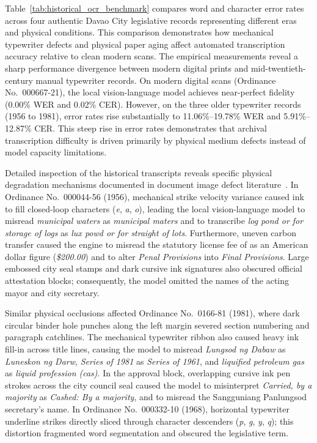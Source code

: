 Table~\ref{tab:historical_ocr_benchmark} compares word and character error rates across four authentic Davao City legislative records representing different eras and physical conditions. This comparison demonstrates how mechanical typewriter defects and physical paper aging affect automated transcription accuracy relative to clean modern scans. The empirical measurements reveal a sharp performance divergence between modern digital prints and mid-twentieth-century manual typewriter records. On modern digital scans (Ordinance No.~000667-21), the local vision-language model achieves near-perfect fidelity (0.00\% WER and 0.02\% CER). However, on the three older typewriter records (1956 to 1981), error rates rise substantially to 11.06\%--19.78\% WER and 5.91\%--12.87\% CER. This steep rise in error rates demonstrates that archival transcription difficulty is driven primarily by physical medium defects instead of model capacity limitations.

Detailed inspection of the historical transcripts reveals specific physical degradation mechanisms documented in document image defect literature~\cite{baird1993defect,lopresti2008optical}. In Ordinance No.~000044-56 (1956), mechanical strike velocity variance caused ink to fill closed-loop characters (\textit{e}, \textit{a}, \textit{o}), leading the local vision-language model to misread \textit{municipal waters} as \textit{municipal maters} and to transcribe \textit{log pond or for storage of logs} as \textit{lux powd or for straight of lots}. Furthermore, uneven carbon transfer caused the engine to misread the statutory license fee of \textit{} as an American dollar figure (\textit{\$200.00}) and to alter \textit{Penal Provisions} into \textit{Final Provisions}. Large embossed city seal stamps and dark cursive ink signatures also obscured official attestation blocks; consequently, the model omitted the names of the acting mayor and city secretary.

Similar physical occlusions affected Ordinance No.~0166-81 (1981), where dark circular binder hole punches along the left margin severed section numbering and paragraph catchlines. The mechanical typewriter ribbon also caused heavy ink fill-in across title lines, causing the model to misread \textit{Lungsod ng Dabaw} as \textit{Luneskon ng Darw}, \textit{Series of 1981} as \textit{Series of 1961}, and \textit{liquified petroleum gas} as \textit{liquid profession (cas)}. In the approval block, overlapping cursive ink pen strokes across the city council seal caused the model to misinterpret \textit{Carried, by a majority} as \textit{Cashed: By a majority}, and to misread the Sangguniang Panlungsod secretary's name. In Ordinance No.~000332-10 (1968), horizontal typewriter underline strikes directly sliced through character descenders (\textit{p}, \textit{g}, \textit{y}, \textit{q}); this distortion fragmented word segmentation and obscured the legislative term.

